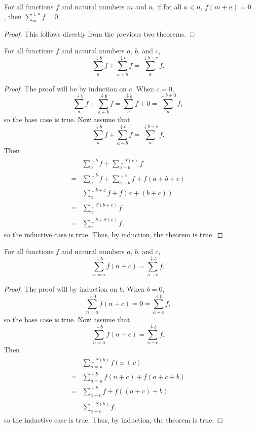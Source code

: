 \documentclass[../math.tex]{subfiles}
\begin{document}
\begin{theorem}
    For all functions $f$ and natural numbers $m$ and $n$, if for all $a < n$,
    $f(m + a) = 0$, then $\sum_m^{\downarrow n} f = 0$.
\end{theorem}
\begin{proof}
    This follows directly from the previous two theorems.
\end{proof}

\begin{theorem}
    For all functions $f$ and natural numbers $a$, $b$, and $c$,
    \[
        \sum_a^{\downarrow b} f + \sum_{a + b}^{\downarrow c} f =
        \sum_a^{\downarrow b + c} f.
    \]
\end{theorem}
\begin{proof}
    The proof will be by induction on $c$.  When $c = 0$,
    \[
        \sum_a^{\downarrow b} f + \sum_{a + b}^{\downarrow 0} f =
        \sum_a^{\downarrow b} f + 0 =
        \sum_a^{\downarrow b + 0} f,
    \]
    so the base case is true.  Now assume that
    \[
        \sum_a^{\downarrow b} f + \sum_{a + b}^{\downarrow c} f =
        \sum_a^{\downarrow b + c} f.
    \]
    Then
    \begin{align*}
           & \sum_a^{\downarrow b} f + \sum_{a + b}^{\downarrow S(c)} f \\
        ={}& \sum_a^{\downarrow b} f + \sum_{a + b}^{\downarrow c} f
            + f(a + b + c) \\
        ={}& \sum_a^{\downarrow b + c} f + f(a + (b + c)) \\
        ={}& \sum_a^{\downarrow S(b + c)} f \\
        ={}& \sum_a^{\downarrow b + S(c)} f,
    \end{align*}
    so the inductive case is true.  Thus, by induction, the theorem is true.
\end{proof}

\begin{theorem}
    For all functions $f$ and natural numbers $a$, $b$, and $c$,
    \[
        \sum_{n = a}^{\downarrow b} f(n + c) = \sum_{a + c}^{\downarrow b} f.
    \]
\end{theorem}
\begin{proof}
    The proof will by induction on $b$.  When $b = 0$,
    \[
        \sum_{n = a}^{\downarrow 0} f(n + c) = 0 =
        \sum_{a + c}^{\downarrow 0} f,
    \]
    so the base case is true.  Now assume that
    \[
        \sum_{n = a}^{\downarrow b} f(n + c) = \sum_{a + c}^{\downarrow b} f.
    \]
    Then
    \begin{align*}
           & \sum_{n = a}^{\downarrow S(b)} f(n + c) \\
        ={}& \sum_{n = a}^{\downarrow b} f(n + c) + f (a + c + b) \\
        ={}& \sum_{a + c}^{\downarrow b} f + f((a + c) + b) \\
        ={}& \sum_{a + c}^{\downarrow S(b)} f,
    \end{align*}
    so the inductive case is true.  Thus, by induction, the theorem is true.
\end{proof}
\end{document}
